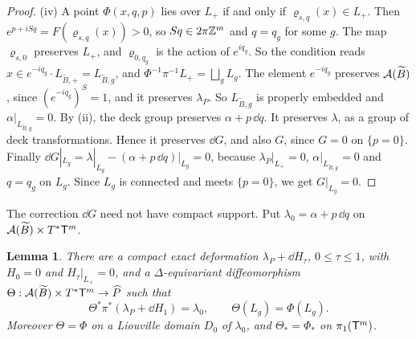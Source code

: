 \documentclass[12pt, letter]{amsart}
\newtheorem{lemma}[dummy]{Lemma}
\theoremstyle{definition}
\begin{document}
\begin{proof}
(iv) A point $\Phi(x,q,p)$ lies over $L_+$ if and only if $\varrho_{s,q}(x)\in L_+$.
Then $e^{p+iSq}=F(\varrho_{s,q}(x))>0$, so $Sq\in2\pi\mathbb{Z}^m$ and $q=q_g$ for some $g$.
The map $\varrho_{s,0}$ preserves $L_+$, and $\varrho_{0,q_g}$ is the action of $e^{iq_g}$.
So the condition reads $x\in e^{-iq_g}\cdot L_{\widetilde B,+}=L_{\widetilde B,g}$, and $\Phi^{-1}\pi^{-1}L_+=\bigsqcup_gL_g$.
The element $e^{-iq_g}$ preserves $\mathcal{A}(\widetilde B)$, since $(e^{-iq_g})^S=1$, and it preserves $\lambda_P$.
So $L_{\widetilde B,g}$ is properly embedded and $\alpha|_{L_{\widetilde B,g}}=0$.
By (ii), the deck group preserves $\alpha+p\,\dd q$.
It preserves $\lambda$, as a group of deck transformations.
Hence it preserves $\dd G$, and also $G$, since $G=0$ on $\{p=0\}$.
Finally $\dd G|_{L_g}=\lambda|_{L_g}-(\alpha+p\,\dd q)|_{L_g}=0$, because $\lambda_P|_{L_+}=0$, $\alpha|_{L_{\widetilde B,g}}=0$ and $q=q_g$ on $L_g$.
Since $L_g$ is connected and meets $\{p=0\}$, we get $G|_{L_g}=0$.
\end{proof}

The correction $\dd G$ need not have compact support.
Put $\lambda_0=\alpha+p\,\dd q$ on $\mathcal{A}(\widetilde B)\times T^*\mathsf T^m$.

\begin{lemma}\label{lem:phase-product}
There are a compact exact deformation $\lambda_P+\dd H_\tau$, $0\le\tau\le1$, with $H_0=0$ and $H_\tau|_{L_+}=0$, and a $\Delta$-equivariant diffeomorphism $\Theta:\mathcal{A}(\widetilde B)\times T^*\mathsf T^m\to\widehat P$ such that
\[
 \Theta^*\pi^*(\lambda_P+\dd H_1)=\lambda_0,\qquad \Theta(L_g)=\Phi(L_g).
\]
Moreover $\Theta=\Phi$ on a Liouville domain $D_0$ of $\lambda_0$, and $\Theta_*=\Phi_*$ on $\pi_1(\mathsf T^m)$.
\end{lemma}
\end{document}
